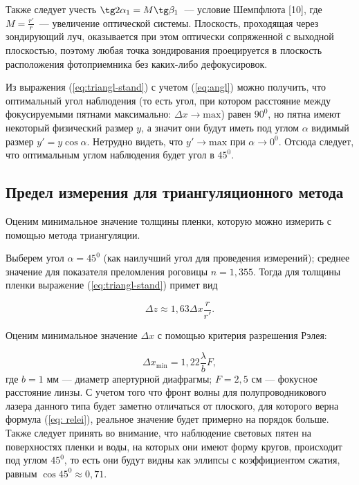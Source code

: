 Также следует учесть $\tg 2\alpha_1=M\tg\beta_1$~--- условие Шемпфлюта [10], где $M=\frac{r'}{r}$~--- увеличение оптической системы. Плоскость, проходящая через зондирующий луч, оказывается при этом оптически сопряженной с выходной плоскостью, поэтому любая точка зондирования проецируется в плоскость расположения фотоприемника без каких-либо дефокусировок.


Из выражения (\ref{eq:triangl-stand}) с учетом (\ref{eq:angl}) можно получить, что оптимальный угол
наблюдения (то есть угол, при котором расстояние между фокусируемыми
пятнами максимально: $\Delta x \to \text{max}$) равен $90^
0$, но пятна имеют некоторый физический размер $y$, а значит они будут иметь под углом $\alpha$ видимый размер $y'=y\cos \alpha$. Нетрудно видеть, что $y' \to \text{max}$ при $ \alpha \to 0^0$. Отсюда следует, что оптимальным углом наблюдения будет угол в $45^0$.

\subsection{Предел измерения для триангуляционного метода}

Оценим минимальное значение толщины пленки, которую можно измерить с помощью метода триангуляции.


Выберем угол $\alpha = 45^0$ (как наилучший угол для проведения измерений); среднее значение для показателя преломления роговицы $n=1,355$. Тогда для толщины пленки выражение
(\ref{eq:triangl-stand}) примет вид

\begin{equation}
\Delta z \approx 1,63 \Delta x \frac{r}{r'}.
\label{eq: tolshina}
\end{equation}

Оценим минимальное значение $\Delta x$ с помощью критерия разрешения Рэлея:

\begin{equation}
\Delta x_{\text{min}}=1,22\frac{\lambda}{b}F,
\label{eq: relei}
\end{equation}
где $b=1$ мм --- диаметр апертурной диафрагмы; $F=2,5$ см --- фокусное расстояние линзы. С учетом того что фронт волны для полупроводникового лазера данного типа будет заметно отличаться от плоского, для которого верна формула (\ref{eq: relei}), реальное значение будет примерно на порядок больше. Также следует принять во внимание, что наблюдение световых пятен на поверхностях пленки и воды, на которых они имеют форму кругов, происходит под углом $45^0$, то есть они будут видны как эллипсы с коэффициентом сжатия, равным $\cos 45^0 \approx 0,71$.\\


